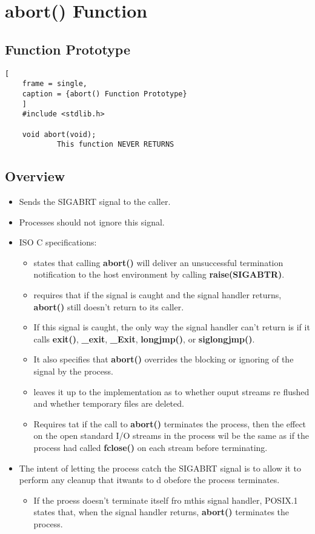 \documentclass{article}
\begin{document}
\section{\textbf{abort()} Function}
\subsection{Function Prototype}
\begin{lstlisting}[
    frame = single,
    caption = {abort() Function Prototype}
    ]
    #include <stdlib.h>

    void abort(void);
            This function NEVER RETURNS
\end{lstlisting}
\subsection{Overview}
\begin{itemize}
\item Sends the SIGABRT signal to the caller.
\item Processes should not ignore this signal.
\item ISO C specifications:
\begin{itemize}
    \item states that calling \textbf{abort()} will deliver an unsuccessful termination notification to the host environment by calling \textbf{raise(SIGABTR)}.
    \item requires that if the signal is caught and the signal handler returns, \textbf{abort()} still doesn't return to its caller.
    \item If this signal is caught, the only way the signal handler can't return is if it calls \textbf{exit()}, \textbf{\_exit}, \textbf{\_Exit}, \textbf{longjmp()}, or \textbf{siglongjmp()}.
    \item It also specifies that \textbf{abort()} overrides the blocking or ignoring of the signal by the process.
    \item leaves it up to the implementation as to whether ouput streams re flushed and whether temporary files are deleted.
    \item Requires tat if the call to \textbf{abort()} terminates the process, then the effect on the open standard I/O streams in the process wil be the same as if the process had called \textbf{fclose()} on each stream before terminating.
\end{itemize}
\item The intent of letting the process catch the SIGABRT signal is to allow it to perform any cleanup that itwants to d obefore the process terminates.
    \begin{itemize}
        \item If the proess doesn't terminate itself fro mthis signal handler, POSIX.1 states that, when the signal handler returns, \textbf{abort()} terminates the process.
    \end{itemize}
\end{itemize}
\end{document}
